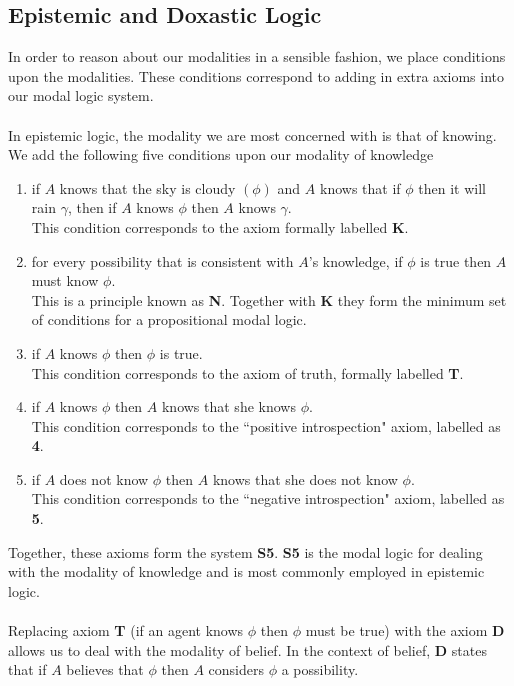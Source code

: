 \documentclass[10pt, a4paper, twoside]{article}
\begin{document}
\subsection{Epistemic and Doxastic Logic}\label{epistemic_logics}
In order to reason about our modalities in a sensible fashion, we place
conditions upon the modalities.
These conditions correspond to adding in extra axioms into our modal logic
system.\\
\\
In epistemic logic, the modality we are most concerned with is that of knowing.
We add the following five conditions upon our modality of knowledge
\begin{enumerate}
	\item if $A$ knows that the sky is cloudy $(\phi)$ and $A$ knows that if
	$\phi$ then it will rain $\gamma$, then if $A$ knows $\phi$ then $A$ knows
	$\gamma$.\\
	This condition corresponds to the axiom formally labelled {\bf K}.
	\item for every possibility that is consistent with $A$'s knowledge, if $\phi$
	is true then $A$ must know $\phi$.\\
	This is a principle known as {\bf N}.
	Together with {\bf K} they form the minimum set of conditions for a
	propositional modal logic.
	\item if $A$ knows $\phi$ then $\phi$ is true.\\
	This condition corresponds to the axiom of truth, formally labelled {\bf T}.
	\item if $A$ knows $\phi$ then $A$ knows that she knows $\phi$.\\
	This condition corresponds to the ``positive introspection" axiom, labelled 
	as {\bf 4}.
	\item if $A$ does not know $\phi$ then $A$ knows that she does not know
	$\phi$.\\
	This condition corresponds to the ``negative introspection" axiom, labelled 
	as {\bf 5}.
\end{enumerate}
Together, these axioms form the system {\bf S5}.
{\bf S5} is the modal logic for dealing with the modality of knowledge and is
most commonly employed in epistemic logic.\\
\\
Replacing axiom {\bf T} (if an agent knows $\phi$ then $\phi$ must be true) with
the axiom {\bf D} allows us to deal with the modality of belief.
In the context of belief, {\bf D} states that if $A$ believes that $\phi$ then
$A$ considers $\phi$ a possibility.
\end{document}
